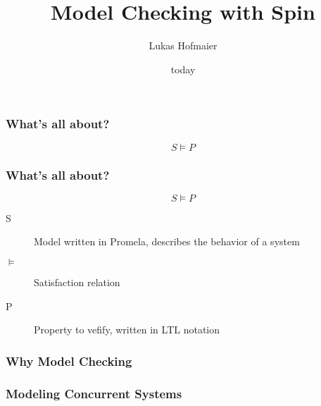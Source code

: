 \documentclass{beamer}
\title{Model Checking with Spin}
\author{Lukas Hofmaier}
\date{today}
\begin{document}
\maketitle
\begin{frame}
  \frametitle{What's all about?}
  \[
  S \models P
  \]
\end{frame}

\begin{frame}
  \frametitle{What's all about?}
  \[
  S \models P
  \]
  \begin{description}
  \item[S] Model written in Promela, describes the behavior of a system
  \item[$\models$] Satisfaction relation
  \item[P] Property to vefify, written in LTL notation
  \end{description}
\end{frame}

\begin{frame}
  \frametitle{Why Model Checking}
\end{frame}
\begin{frame}
  \frametitle{Modeling Concurrent Systems}
  
\end{frame}
\end{document}
